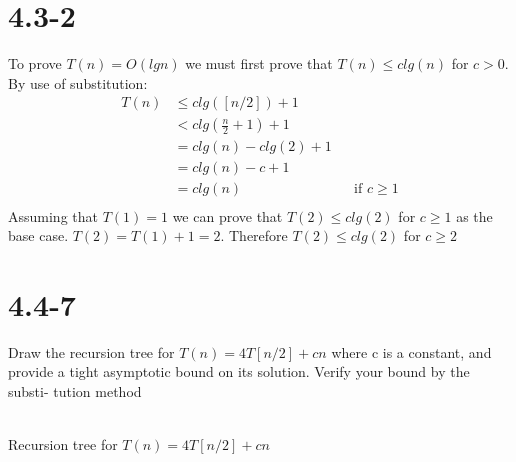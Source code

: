\documentclass{article}
\begin{document}
{\section{4.3-2}
To prove $T(n) = O(lgn)$ we must first prove that $T(n) \leq clg(n)$ for $c > 0$.
By use of substitution: \\
\begin{align*}
  T(n) &\leq clg([n/2]) + 1 \\
       &< clg(\frac{n}{2} + 1) + 1 \\
       &= clg(n) - clg(2) + 1 \\
       &= clg(n) - c + 1 \\
       &= clg(n) && \text{if $c \geq 1$} \\
\end{align*}
Assuming that $T(1) = 1$ we can prove that $T(2) \leq clg(2)$ for $c \geq 1$ as the base case.
$T(2) = T(1) + 1 = 2$. Therefore $T(2) \leq clg(2)$ for $c \geq 2$

\section{4.4-7}
Draw the recursion tree for $T(n) = 4T[n/2]  + cn$ where c is a constant, and
provide a tight asymptotic bound on its solution. Verify your bound by the substi-
tution method \\ \\

\begin{centering}
Recursion tree for $T(n) = 4T[n/2]  + cn$ \\
\end{centering}
\resizebox{0.9\textwidth}{!}{
\Tree [.$cn$ [.$c(n/2)$ $T(n/4)$ $T(n/4)$ $T(n/4)$ $T(n/4)$ ] [.$c(n/2)$ $T(n/4)$ $T(n/4)$ $T(n/4)$ $T(n/4)$ ] [.$c(n/2)$ $T(n/4)$ $T(n/4)$ $T(n/4)$ $T(n/4)$ ] [.$c(n/2)$ $T(n/4)$ $T(n/4)$ $T(n/4)$ $T(n/4)$ ] ]
} \\ \\

}
\end{document}
